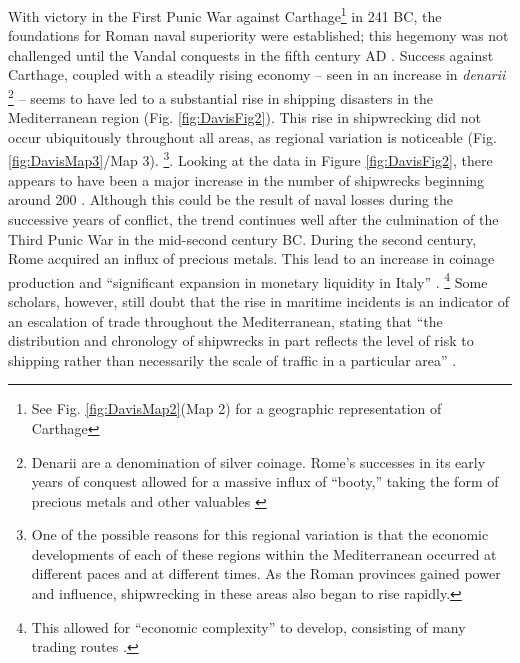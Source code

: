 With victory in the First Punic War against Carthage\footnote{See Fig. \ref{fig:DavisMap2}(Map 2) for a geographic representation of Carthage} in 241 BC, the foundations for Roman naval superiority were established; this hegemony was not challenged until the Vandal conquests in the fifth century AD \parencite[8]{Scheidel_2009a}. Success against Carthage, coupled with a steadily rising economy – seen in an increase in \textit{denarii}
\footnote{Denarii are a denomination of silver coinage. Rome’s successes in its early years of conquest allowed for a massive influx of “booty,” taking the form of precious metals and other valuables \parencite{Kay_2014}}
\parencite[11]{Kay_2014} – seems to have led to a substantial rise in shipping disasters in the Mediterranean region (Fig. \ref{fig:DavisFig2}). This rise in shipwrecking did not occur ubiquitously throughout all areas, as regional variation is noticeable (Fig. \ref{fig:DavisMap3}/Map 3).
\footnote{One of the possible reasons for this regional variation is that the economic developments of each of these regions within the Mediterranean occurred at different paces and at different times. As the Roman provinces gained power and influence, shipwrecking in these areas also began to rise rapidly.}. Looking at the data in Figure \ref{fig:DavisFig2}, there appears to have been a major increase in the number of shipwrecks beginning around 200 \BC. Although this could be the result of naval losses during the successive years of conflict, the trend continues well after the culmination of the Third Punic War in the mid-second century BC.  During the second century, Rome acquired an influx of precious metals. This lead to an increase in coinage production and “significant expansion in monetary liquidity in Italy” \parencite[2]{Kay_2014}.
\footnote{This allowed for “economic complexity” to develop, consisting of many trading routes \parencite[2]{Kay_2014}.} Some scholars, however, still doubt that the rise in maritime incidents is an indicator of an escalation of trade throughout the Mediterranean, stating that “the distribution and chronology of shipwrecks in part reﬂects the level of risk to shipping rather than necessarily the scale of traffic in a particular area” \parencite[145]{Russell_2011}.



